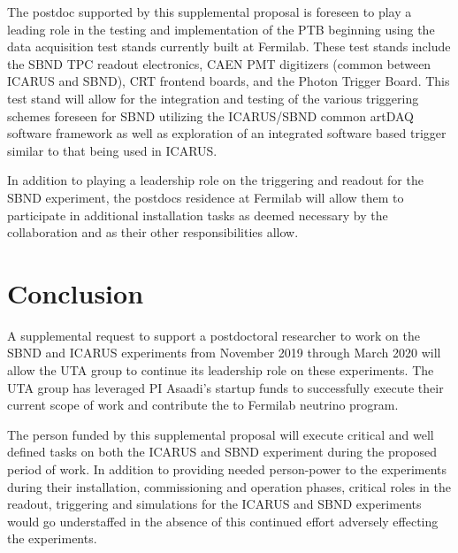 The postdoc supported by this supplemental proposal is foreseen to play a leading role in the testing and implementation of the PTB beginning using the data acquisition test stands currently built at Fermilab. These test stands include the SBND TPC readout electronics, CAEN PMT digitizers (common between ICARUS and SBND), CRT frontend boards, and the Photon Trigger Board. This test stand will allow for the integration and testing of the various triggering schemes foreseen for SBND utilizing the ICARUS/SBND common artDAQ software framework  as well as exploration of an integrated software based trigger similar to that being used in ICARUS. 

In addition to playing a leadership role on the triggering and readout for the SBND experiment, the postdocs residence at Fermilab will allow them to participate in additional installation tasks as deemed necessary by the collaboration and as their other responsibilities allow. 

\section*{Conclusion}

A supplemental request to support a postdoctoral researcher to work on the SBND and ICARUS experiments from November 2019 through March 2020 will allow the UTA group to continue its leadership role on these experiments. The UTA group has leveraged PI Asaadi's startup funds to successfully execute their current scope of work and contribute the to Fermilab neutrino program. 

The person funded by this supplemental proposal will execute critical and well defined tasks on both the ICARUS and SBND experiment during the proposed period of work. In addition to providing needed person-power to the experiments during their installation, commissioning and operation phases, critical roles in the readout, triggering and simulations for the ICARUS and SBND experiments would go understaffed in the absence of this continued effort adversely effecting the experiments. 